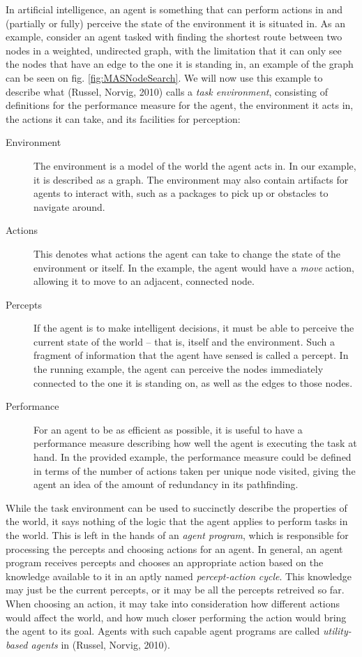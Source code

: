 In artificial intelligence, an agent is something that can perform
actions in and (partially or fully) perceive the state of the environment
it is situated in. As an example, consider an agent tasked with finding
the shortest route between two nodes in a weighted, undirected graph,
with the limitation that it can only see the nodes that have an edge
to the one it is standing in, an example of the graph can be seen
on fig. \ref{fig:MASNodeSearch}. We will now use this example to
describe what (Russel, Norvig, 2010) calls a \emph{task environment},
consisting of definitions for the performance measure for the agent,
the environment it acts in, the actions it can take, and its facilities
for perception:
\begin{description}
\item [{Environment}] The environment is a model of the world the agent
acts in. In our example, it is described as a graph. The environment
may also contain artifacts for agents to interact with, such as a
packages to pick up or obstacles to navigate around.
\item [{Actions}] This denotes what actions the agent can take to change
the state of the environment or itself. In the example, the agent
would have a \emph{move} action, allowing it to move to an adjacent,
connected node.
\item [{Percepts}] If the agent is to make intelligent decisions, it must
be able to perceive the current state of the world -- that is, itself
and the environment. Such a fragment of information that the agent
have sensed is called a percept. In the running example, the agent
can perceive the nodes immediately connected to the one it is standing
on, as well as the edges to those nodes.
\item [{Performance}] For an agent to be as efficient as possible, it is
useful to have a performance measure describing how well the agent
is executing the task at hand. In the provided example, the performance
measure could be defined in terms of the number of actions taken per
unique node visited, giving the agent an idea of the amount of redundancy
in its pathfinding.
\end{description}
While the task environment can be used to succinctly describe the
properties of the world, it says nothing of the logic that the agent
applies to perform tasks in the world. This is left in the hands of
an \emph{agent program}, which is responsible for processing the percepts
and choosing actions for an agent. In general, an agent program receives
percepts and chooses an appropriate action based on the knowledge
available to it in an aptly named \emph{percept-action} \emph{cycle}.
This knowledge may just be the current percepts, or it may be all
the percepts retreived so far. When choosing an action, it may take
into consideration how different actions would affect the world, and
how much closer performing the action would bring the agent to its
goal. Agents with such capable agent programs are called \emph{utility-based
agents} in (Russel, Norvig, 2010).


